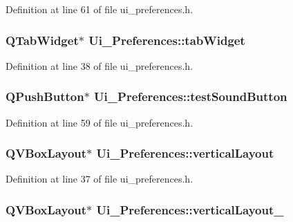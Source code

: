 Definition at line 61 of file ui\_\-preferences.h.

\hypertarget{classUi__Preferences_a4f58302cca06f93e8714c6bd88b48aa6}{
\subsubsection[{tabWidget}]{\setlength{\rightskip}{0pt plus 5cm}QTabWidget$\ast$ {\bf Ui\_\-Preferences::tabWidget}}}
\label{classUi__Preferences_a4f58302cca06f93e8714c6bd88b48aa6}


Definition at line 38 of file ui\_\-preferences.h.

\hypertarget{classUi__Preferences_a47f2c2d39f53cc25b5e40b919481cee0}{
\subsubsection[{testSoundButton}]{\setlength{\rightskip}{0pt plus 5cm}QPushButton$\ast$ {\bf Ui\_\-Preferences::testSoundButton}}}
\label{classUi__Preferences_a47f2c2d39f53cc25b5e40b919481cee0}


Definition at line 59 of file ui\_\-preferences.h.

\hypertarget{classUi__Preferences_a722426c9c3f286e8490cb46d018dde0f}{
\subsubsection[{verticalLayout}]{\setlength{\rightskip}{0pt plus 5cm}QVBoxLayout$\ast$ {\bf Ui\_\-Preferences::verticalLayout}}}
\label{classUi__Preferences_a722426c9c3f286e8490cb46d018dde0f}


Definition at line 37 of file ui\_\-preferences.h.

\hypertarget{classUi__Preferences_ada291fec660d38eddb347e9da5253d35}{
\subsubsection[{verticalLayout\_\-2}]{\setlength{\rightskip}{0pt plus 5cm}QVBoxLayout$\ast$ {\bf Ui\_\-Preferences::verticalLayout\_}}}
\label{classUi__Preferences_ada291fec660d38eddb347e9da5253d35}


